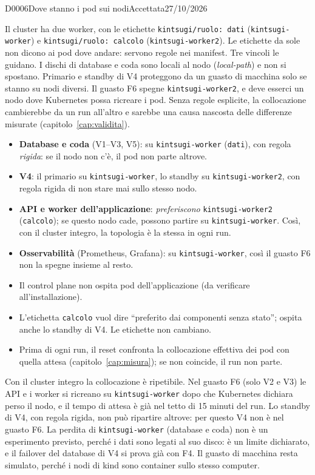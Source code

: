 \begin{decisione}{D0006}{Dove stanno i pod sui nodi}{Accettata}{27/10/2026}

\contesto
Il cluster ha due worker, con le etichette \texttt{kintsugi/ruolo: dati} (\texttt{kintsugi-worker}) e \texttt{kintsugi/ruolo: calcolo} (\texttt{kintsugi-worker2}). Le etichette da sole non dicono ai pod dove andare: servono regole nei manifest. Tre vincoli le guidano. I dischi di database e coda sono locali al nodo (\textit{local-path}) e non si spostano. Primario e standby di V4 proteggono da un guasto di macchina solo se stanno su nodi diversi. Il guasto F6 spegne \texttt{kintsugi-worker2}, e deve esserci un nodo dove Kubernetes possa ricreare i pod. Senza regole esplicite, la collocazione cambierebbe da un run all'altro e sarebbe una causa nascosta delle differenze misurate (capitolo~\ref{cap:validita}).

\scelta
\begin{itemize}
  \item \textbf{Database e coda} (V1--V3, V5): su \texttt{kintsugi-worker} (\texttt{dati}), con regola \emph{rigida}: se il nodo non c'è, il pod non parte altrove.
  \item \textbf{V4}: il primario su \texttt{kintsugi-worker}, lo standby su \texttt{kintsugi-worker2}, con regola rigida di non stare mai sullo stesso nodo.
  \item \textbf{API e worker dell'applicazione}: \emph{preferiscono} \texttt{kintsugi-worker2} (\texttt{calcolo}); se questo nodo cade, possono partire su \texttt{kintsugi-worker}. Così, con il cluster integro, la topologia è la stessa in ogni run.
  \item \textbf{Osservabilità} (Prometheus, Grafana): su \texttt{kintsugi-worker}, così il guasto F6 non la spegne insieme al resto.
  \item Il control plane non ospita pod dell'applicazione (da verificare all'installazione).
  \item L'etichetta \texttt{calcolo} vuol dire ``preferito dai componenti senza stato''; ospita anche lo standby di V4. Le etichette non cambiano.
  \item Prima di ogni run, il reset confronta la collocazione effettiva dei pod con quella attesa (capitolo~\ref{cap:misura}); se non coincide, il run non parte.
\end{itemize}

\conseguenze
Con il cluster integro la collocazione è ripetibile. Nel guasto F6 (solo V2 e V3) le API e i worker si ricreano su \texttt{kintsugi-worker} dopo che Kubernetes dichiara perso il nodo, e il tempo di attesa è già nel tetto di 15 minuti del run. Lo standby di V4, con regola rigida, non può ripartire altrove: per questo V4 non è nel guasto F6. La perdita di \texttt{kintsugi-worker} (database e coda) non è un esperimento previsto, perché i dati sono legati al suo disco: è un limite dichiarato, e il failover del database di V4 si prova già con F4. Il guasto di macchina resta simulato, perché i nodi di kind sono container sullo stesso computer.


\end{decisione}
